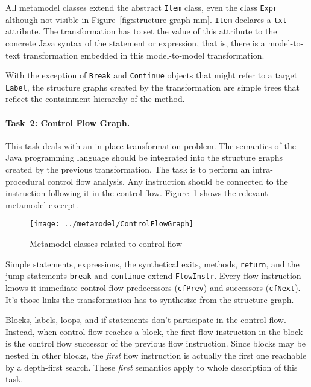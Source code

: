 \documentclass[submission]{eptcs}
\begin{document}
All metamodel classes extend the abstract \verb|Item| class, even the class
\verb|Expr| although not visible in Figure~\ref{fig:structure-graph-mm}.
\verb|Item| declares a \verb|txt| attribute.  The transformation has to set the
value of this attribute to the concrete Java syntax of the statement or
expression, that is, there is a model-to-text transformation embedded in this
model-to-model transformation.

With the exception of \verb|Break| and \verb|Continue| objects that might refer
to a target \verb|Label|, the structure graphs created by the transformation
are simple trees that reflect the containment hierarchy of the method.

\paragraph{Task~2: Control Flow Graph.}
\label{sec:task2-cf-graph}

This task deals with an in-place transformation problem.  The semantics of the
Java programming language should be integrated into the structure graphs
created by the previous transformation.  The task is to perform an
intra-procedural control flow analysis.  Any instruction should be connected to
the instruction following it in the control flow.
Figure~\ref{fig:control-flow-mm} shows the relevant metamodel excerpt.

\begin{figure}[h!]
  \centering
  \texttt{[image: ../metamodel/ControlFlowGraph]}
  \caption{Metamodel classes related to control flow}
  \label{fig:control-flow-mm}
\end{figure}

Simple statements, expressions, the synthetical exits, methods, \verb|return|,
and the jump statements \verb|break| and \verb|continue| extend
\verb|FlowInstr|.  Every flow instruction knows it immediate control flow
predecessors (\verb|cfPrev|) and successors (\verb|cfNext|).  It's those links
the transformation has to synthesize from the structure graph.

Blocks, labels, loops, and if-statements don't participate in the control flow.
Instead, when control flow reaches a block, the first flow instruction in the
block is the control flow successor of the previous flow instruction.  Since
blocks may be nested in other blocks, the \emph{first} flow instruction is
actually the first one reachable by a depth-first search.  These \emph{first}
semantics apply to whole description of this task.
\end{document}
